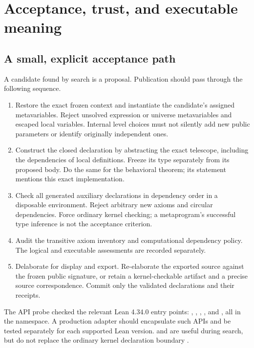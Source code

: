 \section{Acceptance, trust, and executable meaning}
\label{sec:trust}

\subsection{A small, explicit acceptance path}

A candidate found by search is a proposal. Publication should pass through the following sequence.

\begin{enumerate}
\item Restore the exact frozen context and instantiate the candidate's assigned metavariables. Reject unsolved expression or universe metavariables and escaped local variables. Internal level choices must not silently add new public parameters or identify originally independent ones.
\item Construct the closed declaration by abstracting the exact telescope, including the dependencies of local definitions. Freeze its type separately from its proposed body. Do the same for the behavioral theorem; its statement mentions this exact implementation.
\item Check all generated auxiliary declarations in dependency order in a disposable environment. Reject arbitrary new axioms and circular dependencies. Force ordinary kernel checking; a metaprogram's successful type inference is not the acceptance criterion.
\item Audit the transitive axiom inventory and computational dependency policy. The logical and executable assessments are recorded separately.
\item Delaborate for display and export. Re-elaborate the exported source against the frozen public signature, or retain a kernel-checkable artifact and a precise source correspondence. Commit only the validated declarations and their receipts.
\end{enumerate}

The API probe checked the relevant Lean 4.34.0 entry points: , , , , and , all in the  namespace. A production adapter should encapsulate such APIs and be tested separately for each supported Lean version.  and  are useful during search, but do not replace the ordinary kernel declaration boundary \cite{lean-validation}.

